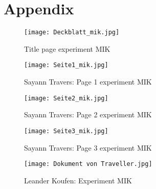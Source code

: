 \section{Appendix}


\begin{figure}[h!]
    \centering
  \texttt{[image: Deckblatt\_mik.jpg]}
  \caption{Title page experiment MIK}
  \end{figure}


\begin{figure}[h!]
    \centering
  \texttt{[image: Seite1\_mik.jpg]}
  \caption{Sayann Travers: Page 1 experiment MIK}
  \end{figure}


\begin{figure}[h!]
    \centering
  \texttt{[image: Seite2\_mik.jpg]}
  \caption{Sayann Travers: Page 2 experiment MIK}
  \end{figure} 


\begin{figure}[h!]
    \centering
  \texttt{[image: Seite3\_mik.jpg]}
  \caption{Sayann Travers: Page 3 experiment MIK}
  \end{figure} 

\begin{figure}[h!]
    \centering
  \texttt{[image: Dokument von Traveller.jpg]}
  \caption{Leander Koufen: Experiment MIK}
  \end{figure} 
